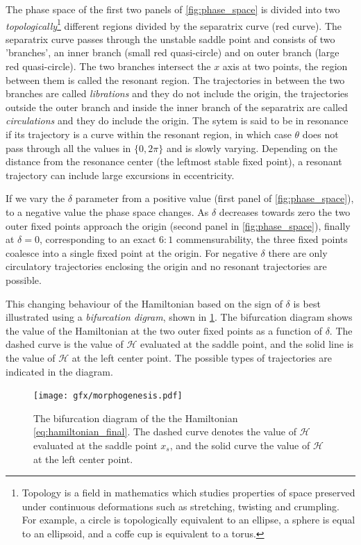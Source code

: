 \documentclass[ twoside,openright,titlepage,numbers=noenddot,headinclude,%
                footinclude=true,cleardoublepage=empty,abstractoff, %
                BCOR=5mm,paper=a4,fontsize=11pt,%
                american,%
                ]{scrreprt}
\begin{document}
The phase space of the first two panels of \cref{fig:phase_space} is divided into two
\emph{topologically}\footnote{Topology is a field in mathematics which studies 
properties of space preserved under continuous deformations such as stretching, twisting
and crumpling. For example, a circle is topologically equivalent to an ellipse, 
a sphere is equal to an ellipsoid, and a coffe cup is equivalent to a torus.} different
regions divided by the separatrix curve (red curve). The separatrix curve passes through
the unstable saddle point and consists of two
'branches', an inner branch (small red quasi-circle) and on outer branch (large red
quasi-circle).  The two branches intersect the $x$ axis at two points, the region between
them is called the resonant region. The trajectories 
in between the two branches are called \emph{librations} and they do not include the origin,
the trajectories outside the outer branch and inside the inner branch of the separatrix
are called \emph{circulations} and they do include the origin. The sytem is said to be
in resonance if its trajectory is a curve within the resonant region, in which case $\theta$
does not pass through all the values in $\{0,2\pi\}$ and is slowly varying. Depending on the
distance from the resonance center (the leftmost stable fixed point), a resonant trajectory
can include large excursions in eccentricity.

If we vary the $\delta$ parameter from a positive value (first panel of \cref{fig:phase_space}),
to a negative value the phase space changes. As $\delta$ decreases towards zero the two
outer fixed points approach the origin (second panel in \cref{fig:phase_space}), finally at 
$\delta=0$, corresponding to an exact $6:1$ commensurability, the three fixed points coalesce
into a single fixed point at the origin. For negative $\delta$ there are only circulatory 
trajectories enclosing the origin and no resonant trajectories are possible. 

This changing
behaviour of the Hamiltonian based on the sign of $\delta$ is best illustrated using
a \emph{bifurcation digram}, shown in \cref{fig:morphogenesis}. The bifurcation diagram
shows the value of the Hamiltonian at the two outer fixed points as a function of $\delta$.
The dashed curve is the value of $\mathcal{H}$ evaluated at the saddle point, and the 
solid line is the value of $\mathcal{H}$ at the left center point. The possible 
types of trajectories are indicated in the diagram.
\begin{figure}[htb]
\centering
\texttt{[image: gfx/morphogenesis.pdf]}
    \caption{The bifurcation diagram of the the Hamiltonian \ref{eq:hamiltonian_final}. 
    The dashed curve denotes the value of $\mathcal{H}$ evaluated at the saddle point $x_s$, and 
    the solid curve the value of $\mathcal{H}$ at the left center point.}
\label{fig:morphogenesis}
\end{figure}
\end{document}
